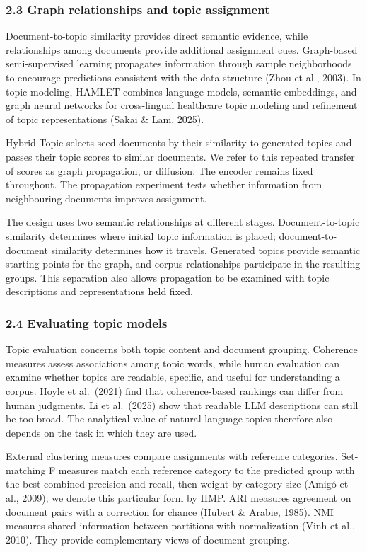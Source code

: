 \documentclass[
  11pt,
  a4paper,
]{article}
\begin{document}
\subsubsection{2.3 Graph relationships and topic
assignment}\label{graph-relationships-and-topic-assignment}

Document-to-topic similarity provides direct semantic evidence, while
relationships among documents provide additional assignment cues.
Graph-based semi-supervised learning propagates information through
sample neighborhoods to encourage predictions consistent with the data
structure (Zhou et al., 2003). In topic modeling, HAMLET combines
language models, semantic embeddings, and graph neural networks for
cross-lingual healthcare topic modeling and refinement of topic
representations (Sakai \& Lam, 2025).

Hybrid Topic selects seed documents by their similarity to generated
topics and passes their topic scores to similar documents. We refer to
this repeated transfer of scores as graph propagation, or diffusion. The
encoder remains fixed throughout. The propagation experiment tests
whether information from neighbouring documents improves assignment.

The design uses two semantic relationships at different stages.
Document-to-topic similarity determines where initial topic information
is placed; document-to-document similarity determines how it travels.
Generated topics provide semantic starting points for the graph, and
corpus relationships participate in the resulting groups. This
separation also allows propagation to be examined with topic
descriptions and representations held fixed.

\subsubsection{2.4 Evaluating topic
models}\label{evaluating-topic-models}

Topic evaluation concerns both topic content and document grouping.
Coherence measures assess associations among topic words, while human
evaluation can examine whether topics are readable, specific, and useful
for understanding a corpus. Hoyle et al.~(2021) find that
coherence-based rankings can differ from human judgments. Li et
al.~(2025) show that readable LLM descriptions can still be too broad.
The analytical value of natural-language topics therefore also depends
on the task in which they are used.

External clustering measures compare assignments with reference
categories. Set-matching F measures match each reference category to the
predicted group with the best combined precision and recall, then weight
by category size (Amigó et al., 2009); we denote this particular form by
HMP. ARI measures agreement on document pairs with a correction for
chance (Hubert \& Arabie, 1985). NMI measures shared information between
partitions with normalization (Vinh et al., 2010). They provide
complementary views of document grouping.
\end{document}
